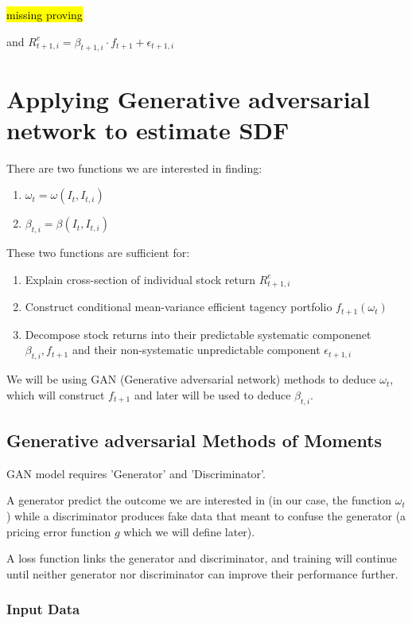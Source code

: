 \documentclass[11pt, oneside]{article}   	%
\begin{document}
\hl{missing proving}

and $R^e_{t+1, i} = \beta_{t+1, i}\cdot f_{t+1} + \epsilon_{t+1, i}$

\section{Applying Generative adversarial network to estimate SDF}

There are two functions we are interested in finding:

\begin{enumerate}
    \item $\omega_t=\omega(I_t, I_{t, i})$
    \item $\beta_{t, i}=\beta(I_t, I_{t, i})$
\end{enumerate}

These two functions are sufficient for:

\begin{enumerate}
    \item Explain cross-section of individual stock return $R^e_{t+1, i}$
    \item Construct conditional mean-variance efficient tagency portfolio $f_{t+1}(\omega_t)$
    \item Decompose stock returns into their predictable systematic componenet $\beta_{t, i}, f_{t+1}$ and their non-systematic unpredictable
        component $\epsilon_{t+1, i}$
\end{enumerate}

We will be using GAN (Generative adversarial network) methods to deduce $\omega_t$, which will construct $f_{t+1}$ and 
later will be used to deduce $\beta_{t, i}$.

\subsection{Generative adversarial Methods of Moments}

GAN model requires 'Generator' and 'Discriminator'.

A generator predict the
outcome we are interested in (in our case, the function $\omega_t$) while a discriminator produces fake
data that meant to confuse the generator (a pricing error function $g$ which we will define later). 

A loss function links the generator and discriminator, and training will continue until
neither generator nor discriminator can improve their performance further.

\subsubsection{Input Data}
\end{document}
